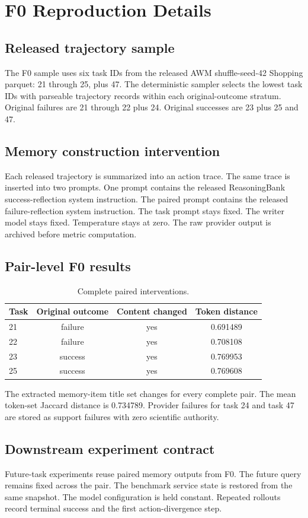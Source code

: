 \section{F0 Reproduction Details}
\subsection{Released trajectory sample}
The F0 sample uses six task IDs from the released AWM shuffle-seed-42 Shopping parquet: 21 through 25, plus 47. The deterministic sampler selects the lowest task IDs with parseable trajectory records within each original-outcome stratum. Original failures are 21 through 22 plus 24. Original successes are 23 plus 25 and 47.

\subsection{Memory construction intervention}
Each released trajectory is summarized into an action trace. The same trace is inserted into two prompts. One prompt contains the released ReasoningBank success-reflection system instruction. The paired prompt contains the released failure-reflection system instruction. The task prompt stays fixed. The writer model stays fixed. Temperature stays at zero. The raw provider output is archived before metric computation.

\subsection{Pair-level F0 results}
\begin{table}[h]
\centering
\caption{Complete paired interventions.}
\small
\begin{tabular}{lccc}
\toprule
Task & Original outcome & Content changed & Token distance \\
\midrule
21 & failure & yes & 0.691489 \\
22 & failure & yes & 0.708108 \\
23 & success & yes & 0.769953 \\
25 & success & yes & 0.769608 \\
\bottomrule
\end{tabular}
\end{table}

The extracted memory-item title set changes for every complete pair. The mean token-set Jaccard distance is 0.734789. Provider failures for task 24 and task 47 are stored as support failures with zero scientific authority.

\subsection{Downstream experiment contract}
Future-task experiments reuse paired memory outputs from F0. The future query remains fixed across the pair. The benchmark service state is restored from the same snapshot. The model configuration is held constant. Repeated rollouts record terminal success and the first action-divergence step.
